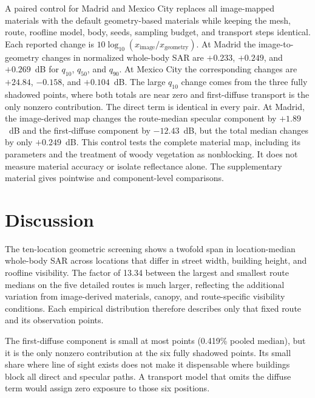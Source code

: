 \documentclass{ieeeaccess}
\begin{document}
A paired control for Madrid and Mexico City replaces all image-mapped materials
with the default geometry-based materials while keeping the mesh, route,
roofline model, body, seeds, sampling budget, and transport steps identical.
Each reported change is
$10\log_{10}(x_{\mathrm{image}}/x_{\mathrm{geometry}})$. At Madrid the
image-to-geometry changes in normalized whole-body SAR are $+0.233$, $+0.249$,
and $+0.269$~dB for $q_{10}$, $q_{50}$, and $q_{90}$. At Mexico City the
corresponding changes are $+24.84$, $-0.158$, and $+0.104$~dB. The large
$q_{10}$ change comes from the three fully shadowed points, where both totals
are near zero and first-diffuse transport is the only nonzero contribution. The
direct term is identical in every pair. At Madrid, the image-derived map changes
the route-median specular component by $+1.89$~dB and the first-diffuse
component by $-12.43$~dB, but the total median changes by only $+0.249$~dB.
This control tests the complete material map, including its parameters and the
treatment of woody vegetation as nonblocking. It does not measure material
accuracy or isolate reflectance alone. The supplementary material gives
pointwise and component-level comparisons.

\section{Discussion}
\label{sec:discussion}

The ten-location geometric screening shows a twofold span in location-median
whole-body SAR across locations that differ in street width, building height,
and roofline visibility. The factor of 13.34 between the largest and smallest
route medians on the five detailed routes is much larger, reflecting the
additional variation from image-derived materials, canopy, and route-specific
visibility conditions. Each empirical distribution therefore describes only
that fixed route and its observation points.

The first-diffuse component is small at most points (0.419\% pooled median),
but it is the only nonzero contribution at the six fully shadowed points. Its
small share where line of sight exists does not make it dispensable where
buildings block all direct and specular paths. A transport model that omits the
diffuse term would assign zero exposure to those six positions.
\end{document}
